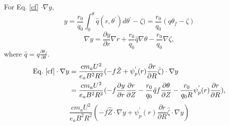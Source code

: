 \documentclass[12pt]{article}
\begin{document}
\begin{CJK*}{UTF8}{gbsn}
For Eq. \ref{cf} $\cdot \nabla y$, 
\begin{equation}
    y = \frac{r_0}{q_0}\int_{0}^{\theta}\hat{q}(r,\theta^{'})d\theta^{'}-\zeta)=\frac{r_0}{q_0}(q\theta_f-\zeta)
\end{equation}
\begin{equation}
    \nabla y = \frac{\partial y}{\partial r} \nabla r + \frac{r_0}{q_0} \hat{q} \nabla \theta - \frac{r_0}{q_0} \nabla \zeta,\label{eqdely}
\end{equation}
where $\hat{q} = q \frac{\partial \theta_f}{\partial \theta}$. 
\begin{equation}
\begin{split}
    \textrm{Eq.}\ \ref{cf} \cdot \nabla y &= \frac{cm_aU^2}{e_aB^2R^2}(-f\hat{Z} + \psi_p^{'}(r)\frac{\partial r}{\partial R} \hat{\zeta}) \cdot \nabla y \\
                                   &= \frac{cm_aU^2}{e_aB^2R^2}(-f \frac{\partial y}{\partial r} \frac{\partial r}{\partial Z} - \frac{r_0}{q_0} \hat{q} f 
                                      \frac{\partial \theta}{\partial Z} - \frac{r_0}{q_0R} \psi_p^{'}(r)\frac{\partial r}{\partial R}), 
\end{split}
\end{equation}
{\color{blue}
\begin{equation*}
    \frac{cm_aU^2}{e_aB^2R^2}(-f\hat{Z}\cdot\nabla y + \psi_p^{'}(r)\frac{\partial r}{\partial R} \hat{\zeta}\cdot\nabla y)  
\end{equation*}
}


\end{CJK*}
\end{document}

